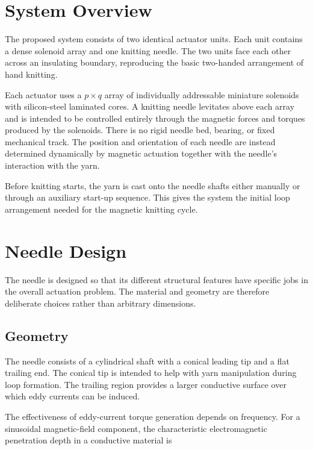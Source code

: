 \documentclass[12pt, a4paper]{article}
\begin{document}
\section{System Overview}

The proposed system consists of two identical actuator units. Each unit contains a dense solenoid array and one knitting needle. The two units face each other across an insulating boundary, reproducing the basic two-handed arrangement of hand knitting.

Each actuator uses a $p \times q$ array of individually addressable miniature solenoids with silicon-steel laminated cores. A knitting needle levitates above each array and is intended to be controlled entirely through the magnetic forces and torques produced by the solenoids. There is no rigid needle bed, bearing, or fixed mechanical track. The position and orientation of each needle are instead determined dynamically by magnetic actuation together with the needle's interaction with the yarn.

Before knitting starts, the yarn is cast onto the needle shafts either manually or through an auxiliary start-up sequence. This gives the system the initial loop arrangement needed for the magnetic knitting cycle.

\section{Needle Design}

The needle is designed so that its different structural features have specific jobs in the overall actuation problem. The material and geometry are therefore deliberate choices rather than arbitrary dimensions.

\subsection{Geometry}

The needle consists of a cylindrical shaft with a conical leading tip and a flat trailing end. The conical tip is intended to help with yarn manipulation during loop formation. The trailing region provides a larger conductive surface over which eddy currents can be induced.

The effectiveness of eddy-current torque generation depends on frequency. For a sinusoidal magnetic-field component, the characteristic electromagnetic penetration depth in a conductive material is
\end{document}
